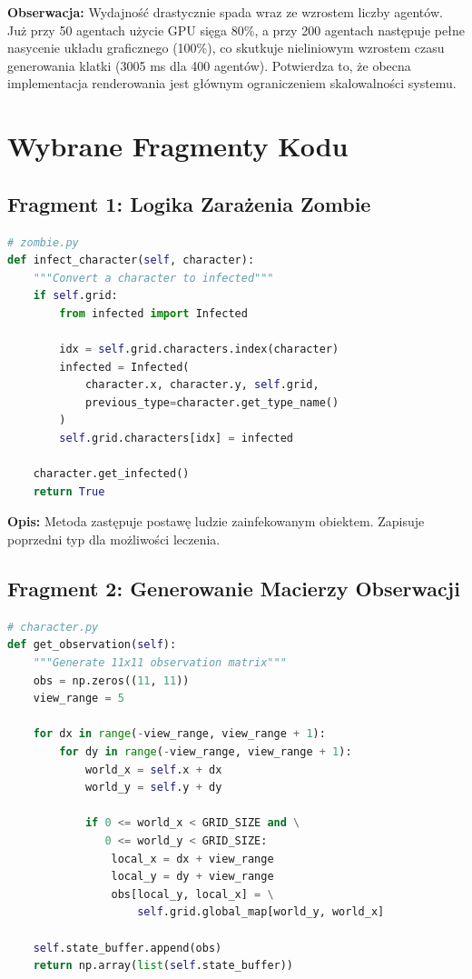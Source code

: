 \documentclass[12pt,a4paper]{article}
\begin{document}
\textbf{Obserwacja:} Wydajność drastycznie spada wraz ze wzrostem liczby agentów. Już przy 50 agentach użycie GPU sięga 80\%, a przy 200 agentach następuje pełne nasycenie układu graficznego (100\%), co skutkuje nieliniowym wzrostem czasu generowania klatki (3005 ms dla 400 agentów). Potwierdza to, że obecna implementacja renderowania jest głównym ograniczeniem skalowalności systemu.

\newpage
\section{Wybrane Fragmenty Kodu}

\subsection{Fragment 1: Logika Zarażenia Zombie}

\begin{lstlisting}[language=Python]
# zombie.py
def infect_character(self, character):
    """Convert a character to infected"""
    if self.grid:
        from infected import Infected
        
        idx = self.grid.characters.index(character)
        infected = Infected(
            character.x, character.y, self.grid, 
            previous_type=character.get_type_name()
        )
        self.grid.characters[idx] = infected
    
    character.get_infected()
    return True
	\end{lstlisting}

\textbf{Opis:} Metoda zastępuje postawę ludzie zainfekowanym obiektem. Zapisuje poprzedni typ dla możliwości leczenia.

\subsection{Fragment 2: Generowanie Macierzy Obserwacji}

\begin{lstlisting}[language=Python]
# character.py
def get_observation(self):
    """Generate 11x11 observation matrix"""
    obs = np.zeros((11, 11))
    view_range = 5
    
    for dx in range(-view_range, view_range + 1):
        for dy in range(-view_range, view_range + 1):
            world_x = self.x + dx
            world_y = self.y + dy
            
            if 0 <= world_x < GRID_SIZE and \
               0 <= world_y < GRID_SIZE:
                local_x = dx + view_range
                local_y = dy + view_range
                obs[local_y, local_x] = \
                    self.grid.global_map[world_y, world_x]
    
    self.state_buffer.append(obs)
    return np.array(list(self.state_buffer))
	\end{lstlisting}
\end{document}

